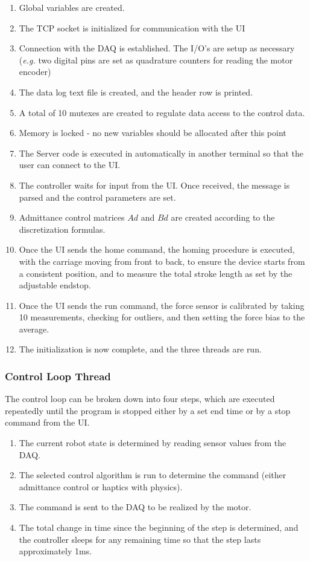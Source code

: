 \documentclass[12pt]{report}
\begin{document}
	\begin{enumerate}
		\item Global variables are created. 		
		\item The TCP socket is initialized for communication with the UI
		\item Connection with the DAQ is established. The I/O's are setup as necessary (\textit{e.g.} two digital pins are set as quadrature counters for reading the motor encoder)
		\item The data log text file is created, and the header row is printed. 
		\item A total of 10 mutexes are created to regulate data access to the control data.
		\item Memory is locked - no new variables should be allocated after this point
		\item The Server code is executed in automatically in another terminal so that the user can connect to the UI.
		\item The controller waits for input from the UI. Once received, the message is parsed and the control parameters are set. 
		\item Admittance control matrices $Ad$ and $Bd$ are created according to the discretization formulas.
		\item Once the UI sends the home command, the homing procedure is executed, with the carriage moving from front to back, to ensure the device starts from a consistent position, and to measure the total stroke length as set by the adjustable endstop. 
		\item Once the UI sends the run command, the force sensor is calibrated by taking 10 measurements, checking for outliers, and then setting the force bias to the average. 
		\item The initialization is now complete, and the three threads are run.
	\end{enumerate}
	
	
	\subsubsection{Control Loop Thread}
	
	The control loop can be broken down into four steps, which are executed repeatedly until the program is stopped either by a set end time or by a stop command from the UI. 
	
	\begin{enumerate}
		\item The current robot state is determined by reading sensor values from the DAQ.
		\item The selected control algorithm is run to determine the command (either admittance control or haptics with physics). 
		\item The command is sent to the DAQ to be realized by the motor. 
		\item The total change in time since the beginning of the step is determined, and the controller sleeps for any remaining time so that the step lasts approximately 1ms. 
	\end{enumerate}
	
\end{document}
